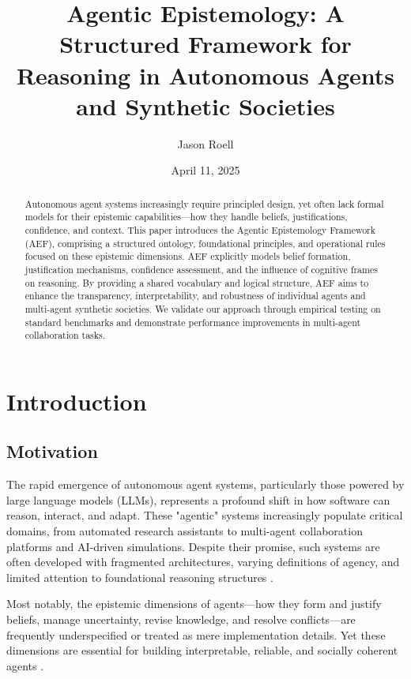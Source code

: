 \documentclass[10pt,a4paper]{article}
\title{Agentic Epistemology: A Structured Framework for Reasoning in Autonomous Agents and Synthetic Societies}
\author{Jason Roell}
\date{April 11, 2025} %
\begin{document}
\maketitle

\begin{abstract}
Autonomous agent systems increasingly require principled design, yet often lack formal models for their epistemic capabilities—how they handle beliefs, justifications, confidence, and context. This paper introduces the Agentic Epistemology Framework (AEF), comprising a structured ontology, foundational principles, and operational rules focused on these epistemic dimensions. AEF explicitly models belief formation, justification mechanisms, confidence assessment, and the influence of cognitive frames on reasoning. By providing a shared vocabulary and logical structure, AEF aims to enhance the transparency, interpretability, and robustness of individual agents and multi-agent synthetic societies. We validate our approach through empirical testing on standard benchmarks and demonstrate performance improvements in multi-agent collaboration tasks.
\end{abstract}

\section{Introduction}
\subsection{Motivation}
The rapid emergence of autonomous agent systems, particularly those powered by large language models (LLMs), represents a profound shift in how software can reason, interact, and adapt. These "agentic" systems increasingly populate critical domains, from automated research assistants to multi-agent collaboration platforms and AI-driven simulations. Despite their promise, such systems are often developed with fragmented architectures, varying definitions of agency, and limited attention to foundational reasoning structures \citep{chase2023langchain, autoGPT, agents_js, react}.

Most notably, the epistemic dimensions of agents—how they form and justify beliefs, manage uncertainty, revise knowledge, and resolve conflicts—are frequently underspecified or treated as mere implementation details. Yet these dimensions are essential for building interpretable, reliable, and socially coherent agents \citep{kahneman1979prospect, epistemic_agents}.
\end{document}
